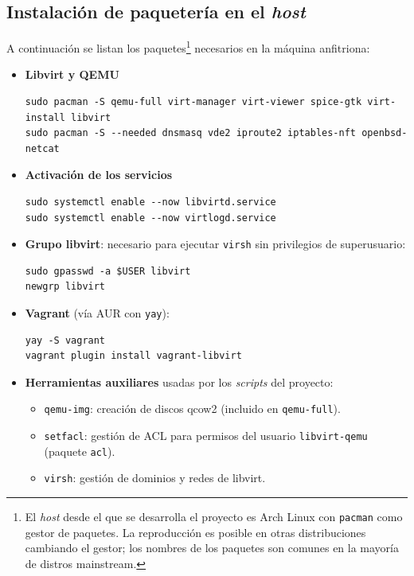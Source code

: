 \subsection{Instalación de paquetería en el \emph{host}}

A continuación se listan los paquetes\footnote{El \emph{host} desde el que se desarrolla el proyecto es Arch Linux con \texttt{pacman} como gestor de paquetes. La reproducción es posible en otras distribuciones cambiando el gestor; los nombres de los paquetes son comunes en la mayoría de distros mainstream.} necesarios en la máquina anfitriona:

\begin{itemize}
  \item \textbf{Libvirt y QEMU}
    \begin{lstlisting}[style=bash]
sudo pacman -S qemu-full virt-manager virt-viewer spice-gtk virt-install libvirt
sudo pacman -S --needed dnsmasq vde2 iproute2 iptables-nft openbsd-netcat
    \end{lstlisting}

  \item \textbf{Activación de los servicios}
    \begin{lstlisting}[style=bash]
sudo systemctl enable --now libvirtd.service
sudo systemctl enable --now virtlogd.service
    \end{lstlisting}

  \item \textbf{Grupo libvirt}: necesario para ejecutar \texttt{virsh} sin privilegios de superusuario:
    \begin{lstlisting}[style=bash]
sudo gpasswd -a $USER libvirt
newgrp libvirt
    \end{lstlisting}

  \item \textbf{Vagrant} (vía AUR con \texttt{yay}):
    \begin{lstlisting}[style=bash]
yay -S vagrant
vagrant plugin install vagrant-libvirt
    \end{lstlisting}

  \item \textbf{Herramientas auxiliares} usadas por los \emph{scripts} del proyecto:
    \begin{itemize}
      \item \texttt{qemu-img}: creación de discos qcow2 (incluido en \texttt{qemu-full}).
      \item \texttt{setfacl}: gestión de ACL para permisos del usuario \texttt{libvirt-qemu} (paquete \texttt{acl}).
      \item \texttt{virsh}: gestión de dominios y redes de libvirt.
    \end{itemize}
\end{itemize}

